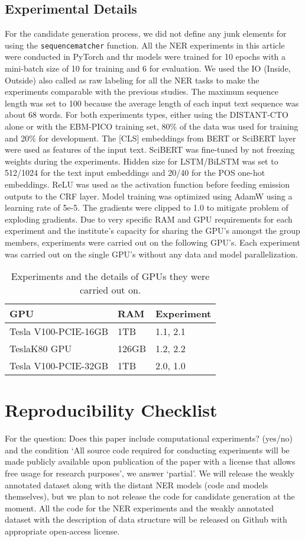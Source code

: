 \documentclass[letterpaper]{article} %
\begin{document}
\subsection{Experimental Details}
\label{app:expdet}
%
For the candidate generation process, we did not define any junk elements for using the {\tt sequencematcher} function.
All the NER experiments in this article were conducted in PyTorch and thr models were trained for 10 epochs with a mini-batch size of 10 for training and 6 for evaluation.
We used the IO (Inside, Outside) also called as raw labeling for all the NER tasks to make the experiments comparable with the previous studies.
The maximum sequence length was set to 100 because the average length of each input text sequence was about 68 words.
For both experiments types, either using the DISTANT-CTO alone or with the EBM-PICO training set, 80\% of the data was used for training and 20\% for development.
The [CLS] embeddings from BERT or SciBERT layer were used as features of the input text.
SciBERT was fine-tuned by not freezing weights during the experiments.
Hidden size for LSTM/BiLSTM was set to 512/1024 for the text input embeddings and 20/40 for the POS one-hot embeddings.
ReLU was used as the activation function before feeding emission outputs to the CRF layer.
Model training was optimized using AdamW using a learning rate of 5e-5.
The gradients were clipped to 1.0 to mitigate problem of exploding gradients.
Due to very specific RAM and GPU requirements for each experiment and the institute's capacity for sharing the GPU's amongst the group members, experiments were carried out on the following GPU's.
Each experiment was carried out on the single GPU's without any data and model parallelization.
%
%
\begin{table}[htp]
\centering
\begin{tabular}{l|l|l}
\hline 
\textbf{GPU} & \textbf{RAM} & \textbf{ Experiment }  \\
\hline
Tesla V100-PCIE-16GB & 1TB  & 1.1, 2.1\\
TeslaK80 GPU & 126GB & 1.2, 2.2\\
Tesla V100-PCIE-32GB & 1TB   & 2.0, 1.0\\
\hline
\end{tabular}
\caption{Experiments and the details of GPUs they were carried out on.}
\label{table:exp_gpu} 
\end{table}
%
%
%
\section{Reproducibility Checklist}
\label{check}
%
For the question: Does this paper include computational experiments? (yes/no) and the condition `All source code required for conducting experiments will be made publicly available upon publication of the paper with a license that allows free usage for research purposes', we answer `partial'.
We will release the weakly annotated dataset along with the distant NER models (code and models themselves), but we plan to not release the code for candidate generation at the moment.
All the code for the NER experiments and the weakly annotated dataset with the description of data structure will be released on Github with appropriate open-access license.
%
%
%
\end{document}
